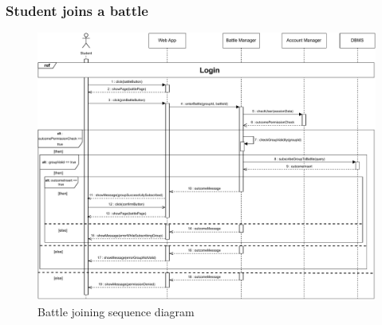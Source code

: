 \documentclass{article}
\begin{document}
{    \subsubsection{Student joins a battle}
        \begin{figure}[H]
            \centering
            \hspace*{-3.1cm}\includegraphics[scale=0.8]{Sequence/Sequence10DD.pdf}
            \caption{Battle joining sequence diagram}
            \label{fig:Sequence10DD}
        \end{figure}
        

}
\end{document}
